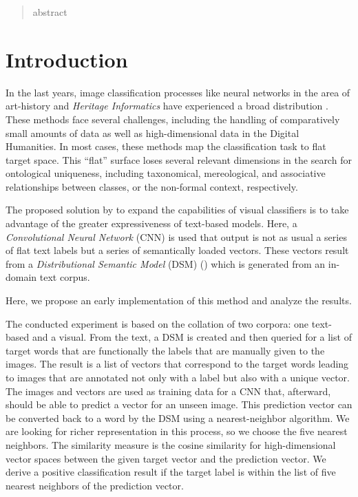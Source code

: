 \begin{abstract}
    abstract
\end{abstract}

\section{Introduction}
In the last years, image classification processes like neural networks in the area of art-history and \emph{Heritage Informatics} have experienced a broad distribution \parencite{lang_AttestingSimilaritySupportingOrganizationStudy_2018}.
These methods face several challenges, including the handling of comparatively small amounts of data as well as high-dimensional data in the Digital Humanities. In most cases, these methods map the classification task to flat target space. This \enquote{flat} surface loses several relevant dimensions in the search for ontological uniqueness, including taxonomical, mereological, and associative relationships between classes, or the non-formal context, respectively.

The proposed solution by \citeauthor{donig_VomBildTextUndWieder_2019a} \parencite{donig_VomBildTextUndWieder_2019a} to expand the capabilities of visual classifiers is to take advantage of the greater expressiveness of text-based models. Here, a \emph{Convolutional Neural Network} (CNN) is used that output is not as usual a series of flat text labels but a series of semantically loaded vectors. These vectors result from a \emph{Distributional Semantic Model} (DSM) (\cite{lenci_DistributionalModelsWordMeaning_2018a}) which is generated from an in-domain text corpus.


Here, we propose an early implementation of this method and analyze the results.

The conducted experiment is based on the collation of two corpora: one text-based and a visual. From the text, a DSM is created and then queried for a list of target words that are functionally the labels that are manually given to the images. The result is a list of vectors that correspond to the target words leading to images that are annotated not only with a label but also with a unique vector. The images and vectors are used as training data for a CNN that, afterward, should be able to predict a vector for an unseen image. This prediction vector can be converted back to a word by the DSM using a nearest-neighbor algorithm. We are looking for richer representation in this process, so we choose the five nearest neighbors. The similarity measure is the cosine similarity for high-dimensional vector spaces between the given target vector and the prediction vector. We derive a positive classification result if the target label is within the list of five nearest neighbors of the prediction vector.

